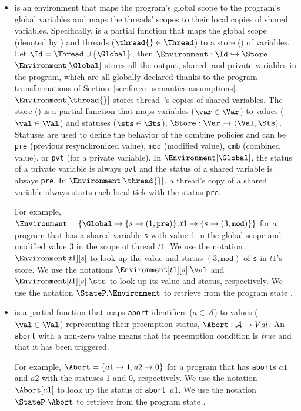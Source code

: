 \begin{itemize}
	\item \Environment{} is an environment that maps the program's global scope to the program's global
		  variables and maps the threads' scopes to their local copies of shared variables. 
		  Specifically, \Environment{} is a partial function that maps the global 
		  scope (denoted by \Global{}) and threads ($\thread{} \in \Thread$) to a 
		  store (\Store{}) of variables. Let $\Id = \Thread \cup \{ \Global \}$, then 
		  $\Environment: \Id \hookrightarrow \Store$.
		  $\Environment[\Global]$ stores all the output, shared, and private variables
		  in the program, which are all globally declared thanks to the program 
		  transformations of Section~\ref{sec:forec_semantics:assumptions}. 
		  $\Environment[\thread{}]$ stores thread~\thread{}'s copies of shared variables. 
		  The store (\Store{}) is a partial function that maps variables ($\var \in \Var$) 
		  to values ($\val \in \Val$) and statuses ($\sts \in \Sts$), $\Store: \Var \hookrightarrow (\Val, \Sts)$. 
		  Statuses are used to define the behavior of the combine policies and
		  can be \verb$pre$ (previous resynchronized value), \verb$mod$ (modified value), 
		  \verb$cmb$ (combined value), or \verb$pvt$ (for a private variable). 
		  In $\Environment[\Global]$, the status of a private variable is always \verb$pvt$ 
		  and the status of a shared variable is always \verb$pre$. In $\Environment[\thread{}]$, 
		  a thread's copy of a shared variable always starts each local tick with
		  the status \verb$pre$.
		  		
		  For example, $\Environment = \left \lbrace \Global \to \lbrace s \to (1, \mathtt{pre}) \rbrace, t1 \to \lbrace s \to (3, \mathtt{mod}) \rbrace \right \rbrace$
		  for a program that has a shared variable \verb$s$ with value 1 in the global scope and modified
		  value $3$ in the scope of thread $t1$. We use the
		  notation $\Environment[t1][s]$ to look up the value and status $(3, \mathtt{mod})$ of \verb$s$ in $t1$'s store.
		  We use the notations $\Environment[t1][s].\val$ and $\Environment[t1][s].\sts$
		  to look up its value and status, respectively.
		  We use the notation $\StateP.\Environment$ to retrieve \Environment{} from the program state \StateP{}.
		  
	\item \Abort{} is a partial function that maps \verb$abort$ identifiers ($a \in \mathcal{A}$) 
		  to values ($\val \in \Val$) representing their preemption status, 
		  $\Abort: \mathcal{A} \to Val$. An \verb$abort$ with a non-zero value means that its
		  preemption condition is \emph{true} and that it has been triggered. 
		  
		  For example, $\Abort = \lbrace a1 \to 1, a2 \to 0 \rbrace$ 
		  for a program that has \verb$abort$s $a1$ and $a2$ with the statuses 1 and 0, respectively.
		  We use the notation $\Abort[a1]$ to look up the status of \verb$abort$~$a1$.
		  We use the notation $\StateP.\Abort$ to retrieve \Abort{} from the program state \StateP{}.
\end{itemize}
